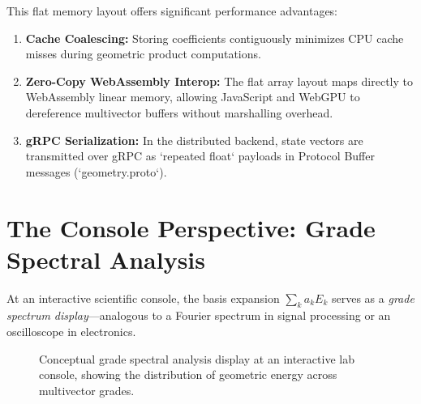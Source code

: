 \documentclass[conference]{IEEEtran}
\begin{document}
This flat memory layout offers significant performance advantages:
\begin{enumerate}
    \item \textbf{Cache Coalescing:} Storing coefficients contiguously minimizes CPU cache misses during geometric product computations.
    \item \textbf{Zero-Copy WebAssembly Interop:} The flat array layout maps directly to WebAssembly linear memory, allowing JavaScript and WebGPU to dereference multivector buffers without marshalling overhead.
    \item \textbf{gRPC Serialization:} In the distributed backend, state vectors are transmitted over gRPC as `repeated float` payloads in Protocol Buffer messages (`geometry.proto`).
\end{enumerate}

\section{The Console Perspective: Grade Spectral Analysis}
\label{sec:console}

At an interactive scientific console, the basis expansion $\sum_k a_k E_k$ serves as a \textit{grade spectrum display}---analogous to a Fourier spectrum in signal processing or an oscilloscope in electronics.

\begin{figure}[htbp]
\centering
{}
\caption{Conceptual grade spectral analysis display at an interactive lab console, showing the distribution of geometric energy across multivector grades.}
\label{fig:spectrum}
\end{figure}
\end{document}
